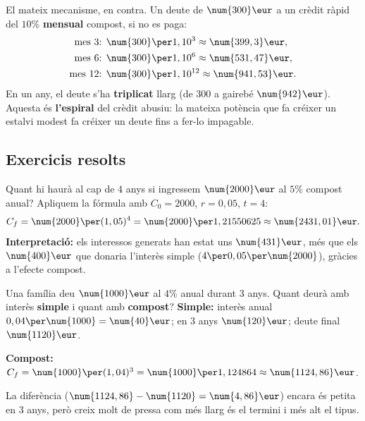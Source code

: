 \begin{exemple}
El mateix mecanisme, en contra. Un deute de $\num{300}\eur$ a un crèdit ràpid del
$10\%$ \textbf{mensual} compost, si no es paga:
\[
\begin{aligned}
\text{mes 3: } &\num{300}\per 1,10^3\approx\num{399,3}\eur,\\
\text{mes 6: } &\num{300}\per 1,10^6\approx\num{531,47}\eur,\\
\text{mes 12: } &\num{300}\per 1,10^{12}\approx\num{941,53}\eur.
\end{aligned}
\]
En un any, el deute s'ha \textbf{triplicat} llarg (de $\num{300}$ a gairebé
$\num{942}\eur$). Aquesta és \textbf{l'espiral} del crèdit abusiu: la mateixa potència
que fa créixer un estalvi modest fa créixer un deute fins a fer-lo impagable.
\end{exemple}

\subsection{Exercicis resolts}

\begin{exresolt}
Quant hi haurà al cap de $4$ anys si ingressem $\num{2000}\eur$ al $5\%$ compost anual?
\solucio
Apliquem la fórmula amb $C_0=\num{2000}$, $r=0,05$, $t=4$:
\[
C_f=\num{2000}\per (1,05)^4=\num{2000}\per 1,21550625\approx\num{2431,01}\eur.
\]
\textbf{Interpretació:} els interessos generats han estat uns $\num{431}\eur$, més que
els $\num{400}\eur$ que donaria l'interès simple ($4\per 0,05\per\num{2000}$), gràcies
a l'efecte compost.
\end{exresolt}

\begin{exresolt}
Una família deu $\num{1000}\eur$ al $4\%$ anual durant $3$ anys. Quant deurà amb
interès \textbf{simple} i quant amb \textbf{compost}?
\solucio
\textbf{Simple:} interès anual $0,04\per\num{1000}=\num{40}\eur$; en $3$ anys
$\num{120}\eur$; deute final $\num{1120}\eur$.

\textbf{Compost:} $C_f=\num{1000}\per (1,04)^3=\num{1000}\per 1,124864\approx\num{1124,86}\eur$.

La diferència ($\num{1124,86}-\num{1120}=\num{4,86}\eur$) encara és petita en $3$ anys,
però creix molt de pressa com més llarg és el termini i més alt el tipus.
\end{exresolt}


